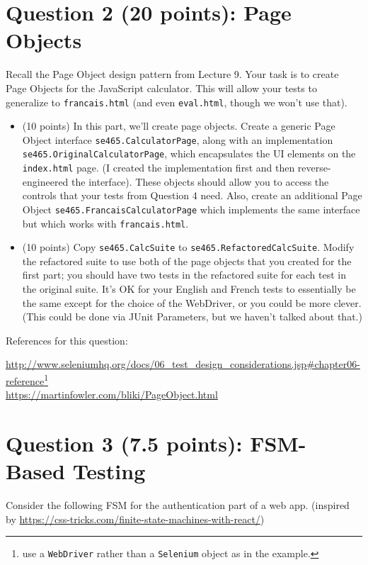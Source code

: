 \documentclass[10pt,hidelinks]{article}
\begin{document}

\section*{Question 2 (20 points): Page Objects}

Recall the Page Object design pattern from Lecture 9. Your task is to create Page Objects for the JavaScript calculator. This will allow your tests to generalize to {\tt francais.html} (and even
{\tt eval.html}, though we won't use that).

\begin{itemize}
\item (10 points) In this part, we'll create page objects. Create a generic Page Object interface {\tt se465.CalculatorPage}, along with an implementation {\tt se465.OriginalCalculatorPage}, which encapsulates the UI elements on the {\tt index.html} page. (I created the implementation first and then reverse-engineered the interface). These objects should allow you to access the controls that your tests from Question 4 need. Also, create an additional Page Object {\tt se465.FrancaisCalculatorPage} which implements the same interface but which works with {\tt francais.html}. 
  \item (10 points) Copy {\tt se465.CalcSuite} to {\tt se465.RefactoredCalcSuite}. Modify the refactored suite to use both of the page objects that you created for the first part; you should have two tests in the refactored suite for each test in the original suite. It's OK for your English and French tests to essentially be the same except for the choice of the WebDriver, or you could be more clever. (This could be done via JUnit Parameters, but we haven't talked about that.)
\end{itemize}

References for this question:

\url{http://www.seleniumhq.org/docs/06_test_design_considerations.jsp#chapter06-reference}\footnote{use a {\tt WebDriver} rather than a {\tt Selenium} object as in the example.}
\\
\url{https://martinfowler.com/bliki/PageObject.html}

\section*{Question 3 (7.5 points): FSM-Based Testing}
Consider the following FSM for the authentication part of a web app.
(inspired by \url{https://css-tricks.com/finite-state-machines-with-react/})
\end{document}

